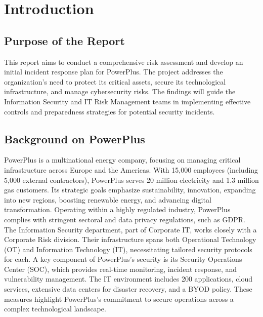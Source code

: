 \chapter{Introduction}

\section{Purpose of the Report}

This report aims to conduct a comprehensive risk assessment and develop an initial incident response plan for PowerPlus. The project addresses the organization's need to protect its critical assets, secure its technological infrastructure, and manage cybersecurity risks. The findings will guide the Information Security and IT Risk Management teams in implementing effective controls and preparedness strategies for potential security incidents.

\section{Background on PowerPlus}


PowerPlus is a multinational energy company, focusing on managing critical infrastructure across Europe and the Americas. With 15,000 employees (including 5,000 external contractors), PowerPlus serves 20 million electricity and 1.3 million gas customers. Its strategic goals emphasize sustainability, innovation, expanding into new regions, boosting renewable energy, and advancing digital transformation.
Operating within a highly regulated industry, PowerPlus complies with stringent sectoral and data privacy regulations, such as GDPR. The Information Security department, part of Corporate IT, works closely with a Corporate Risk division. Their infrastructure spans both Operational Technology (OT) and Information Technology (IT), necessitating tailored security protocols for each.
A key component of PowerPlus's security is its Security Operations Center (SOC), which provides real-time monitoring, incident response, and vulnerability management. The IT environment includes 200 applications, cloud services, extensive data centers for disaster recovery, and a BYOD policy. These measures highlight PowerPlus's commitment to secure operations across a complex technological landscape.

